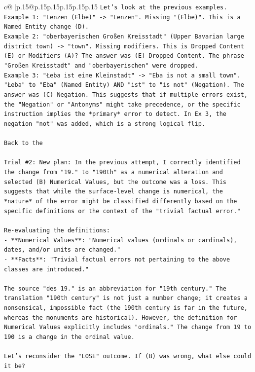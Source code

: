 \documentclass{article}
\begin{document}
{\begin{supertabular}{c@{$\;$}|p{.15\linewidth}@{}p{.15\linewidth}p{.15\linewidth}p{.15\linewidth}p{.15\linewidth}p{.15\linewidth}}
{{{\texttt{Let's look at the previous examples.} \\
\texttt{Example 1: "Lenzen (Elbe)" {-}> "Lenzen". Missing "(Elbe)". This is a Named Entity change (D).} \\
\texttt{Example 2: "oberbayerischen Großen Kreisstadt" (Upper Bavarian large district town) {-}> "town". Missing modifiers. This is Dropped Content (E) or Modifiers (A)? The answer was (E) Dropped Content. The phrase "Großen Kreisstadt" and "oberbayerischen" were dropped.} \\
\texttt{Example 3: "Łeba ist eine Kleinstadt" {-}> "Eba is not a small town". "Łeba" to "Eba" (Named Entity) AND "ist" to "is not" (Negation). The answer was (C) Negation. This suggests that if multiple errors exist, the "Negation" or "Antonyms" might take precedence, or the specific instruction implies the *primary* error to detect. In Ex 3, the negation "not" was added, which is a strong logical flip.} \\
\\ 
\texttt{Back to the} \\
\\ 
\texttt{Trial \#2: New plan: In the previous attempt, I correctly identified the change from "19." to "190th" as a numerical alteration and selected (B) Numerical Values, but the outcome was a loss. This suggests that while the surface{-}level change is numerical, the *nature* of the error might be classified differently based on the specific definitions or the context of the "trivial factual error."} \\
\\ 
\texttt{Re{-}evaluating the definitions:} \\
\texttt{{-} **Numerical Values**: "Numerical values (ordinals or cardinals), dates, and/or units are changed."} \\
\texttt{{-} **Facts**: "Trivial factual errors not pertaining to the above classes are introduced."} \\
\\ 
\texttt{The source "des 19." is an abbreviation for "19th century." The translation "190th century" is not just a number change; it creates a nonsensical, impossible fact (the 190th century is far in the future, whereas the monuments are historical). However, the definition for Numerical Values explicitly includes "ordinals." The change from 19 to 190 is a change in the ordinal value.} \\
\\ 
\texttt{Let's reconsider the "LOSE" outcome. If (B) was wrong, what else could it be?} \\
}}}
\end{supertabular}}
\end{document}
